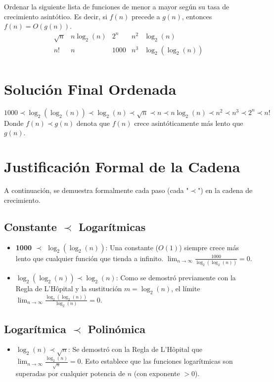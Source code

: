 \documentclass[12pt, a4paper]{article}
\theoremstyle{definition}
\begin{document}
Ordenar la siguiente lista de funciones de menor a mayor según su tasa de crecimiento asintótico. Es decir, si $f(n)$ precede a $g(n)$, entonces $f(n) = O(g(n))$.
\[
\begin{array}{ccccc}
    \sqrt{n} & n \log_2(n) & 2^n & n^2 & \log_2(n) \\
    n! & n & 1000 & n^3 & \log_2(\log_2(n)) \\
\end{array}
\]

\hrulefill
\section{Solución Final Ordenada}

\[
1000 \prec \log_2(\log_2(n)) \prec \log_2(n) \prec \sqrt{n} \prec n \prec n \log_2(n) \prec n^2 \prec n^3 \prec 2^n \prec n!
\]
Donde $f(n) \prec g(n)$ denota que $f(n)$ crece asintóticamente más lento que $g(n)$.

\hrulefill
\section{Justificación Formal de la Cadena}

A continuación, se demuestra formalmente cada paso (cada "$\prec$") en la cadena de crecimiento.

\subsection{Constante $\prec$ Logarítmicas}
\begin{itemize}
    \item \textbf{1000 $\prec$ $\log_2(\log_2(n))$}: Una constante ($O(1)$) siempre crece más lento que cualquier función que tienda a infinito. $\lim_{n \to \infty} \frac{1000}{\log_2(\log_2(n))} = 0$.
    \item \textbf{$\log_2(\log_2(n)) \prec \log_2(n)$}: Como se demostró previamente con la Regla de L'Hôpital y la sustitución $m = \log_2(n)$, el límite $\lim_{n \to \infty} \frac{\log_2(\log_2(n))}{\log_2(n)} = 0$.
\end{itemize}

\subsection{Logarítmica $\prec$ Polinómica}
\begin{itemize}
    \item \textbf{$\log_2(n) \prec \sqrt{n}$}: Se demostró con la Regla de L'Hôpital que $\lim_{n \to \infty} \frac{\log_2(n)}{\sqrt{n}} = 0$. Esto establece que las funciones logarítmicas son superadas por cualquier potencia de $n$ (con exponente $> 0$).
\end{itemize}
\end{document}
